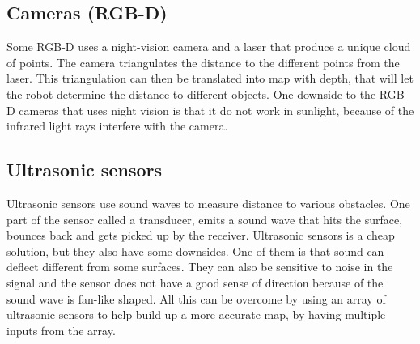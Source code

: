 \subsection{Cameras (RGB-D) } \label{ch:CameraRGB}

Some RGB-D uses a night-vision camera and a laser that produce a unique cloud of points. The camera triangulates the distance to the different points from the laser. This triangulation can then be translated into map with depth, that will let the robot determine the distance to different objects. 
One downside to the RGB-D cameras that uses night vision is that it do not work in sunlight, because of the infrared light rays interfere with the camera\cite{Cameras}.

\subsection{Ultrasonic sensors}
Ultrasonic sensors use sound waves to measure distance to various obstacles. One part of the sensor called a transducer, emits a sound wave that hits the surface, bounces back and gets picked up by the receiver. 
Ultrasonic sensors is a cheap solution, but they also have some downsides. One of them is that sound can deflect different from some surfaces. They can also be sensitive to noise in the signal and the sensor does not have a good sense of direction because of the sound wave is fan-like shaped. All this can be overcome by using an array of ultrasonic sensors to help build up a more accurate map, by having multiple inputs from the array\cite{Ultrasonicsnesor}.
